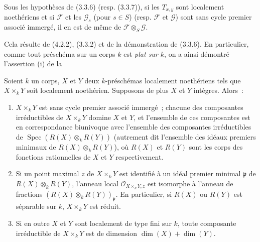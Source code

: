 \begin{corollary}[4.2.3]
\label{IV.2.4.2.3-fr}
Sous les hypothèses de (3.3.6) (resp. (3.3.7)), si les $T_{x,y}$ sont
localement noethériens et si $\mathcal F$ et les $\mathcal G_s$ (pour $s\in S$)
(resp. $\mathcal F$ et $\mathcal G$) sont sans cycle premier associé immergé,
il en est de même de $\mathcal F\otimes_S\mathcal G$.
\end{corollary}

Cela résulte de (4.2.2), (3.3.2) et de la démonstration de (3.3.6). En
particulier, comme tout préschéma sur un corps $k$ est \emph{plat sur $k$}, on
a ainsi démontré l'assertion (i) de la

\begin{proposition}[4.2.4]
\label{IV.2.4.2.4-fr}
Soient $k$ un corps, $X$ et $Y$ deux $k$-préschémas localement noethériens
tels que $X\times_k Y$ soit localement noethérien. Supposons de plus $X$ et
$Y$ intègres. Alors~:
\begin{enumerate}
\item[(i)] $X\times_k Y$ est sans cycle premier associé immergé~; chacune des
composantes irréductibles de $X\times_k Y$ domine $X$ et $Y$, et l'ensemble de
ces composantes est en correspondance biunivoque avec l'ensemble des
composantes irréductibles de
$\operatorname{Spec}(R(X)\otimes_k R(Y))$ (autrement dit l'ensemble des
idéaux premiers minimaux de $R(X)\otimes_k R(Y)$), où $R(X)$ et $R(Y)$ sont
les corps des fonctions rationnelles de $X$ et $Y$ respectivement.
\item[(ii)] Si un point maximal $z$ de $X\times_k Y$ est identifié à un idéal
premier minimal $\mathfrak p$ de $R(X)\otimes_k R(Y)$, l'anneau local
$\mathcal O_{X\times_k Y,z}$ est isomorphe à l'anneau de fractions
$(R(X)\otimes_k R(Y))_{\mathfrak p}$. En particulier, si $R(X)$ ou $R(Y)$ est
séparable sur $k$, $X\times_k Y$ est réduit.


\item[(iii)] Si en outre $X$ et $Y$ sont localement de type fini sur $k$,
toute composante irréductible de $X\times_k Y$ est de dimension
$\dim(X)+\dim(Y)$.
\end{enumerate}
\end{proposition}

